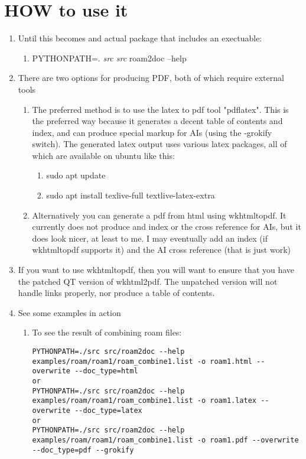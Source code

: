 \documentclass[11pt]{article}
\begin{document}
\section{HOW to use it  }
 \label{obj-47}
 \label{obj-46}
\begin{enumerate}
\item
Until this becomes and actual package that includes an exectuable:
\begin{enumerate}
\item
PYTHONPATH=.
\emph{src src}
roam2doc --help
\end{enumerate}
\item
There are two options for producing PDF, both of which require external tools
\begin{enumerate}
\item
The preferred method is to use the latex to pdf tool
      "pdflatex". This is the preferred way because it generates a decent
      table of contents and index, and can produce special markup for AIs
      (using the -grokify switch). The generated latex output uses various latex
      packages, all of which are available on ubuntu like this:

\begin{enumerate}
\item
sudo apt update
\item
sudo apt install texlive-full textlive-latex-extra
\end{enumerate}
\item
Alternatively you can generate a pdf from html using wkhtmltopdf. It
      currently does not produce and index or the cross reference for AIs,
      but it does look nicer, at least to me. I may eventually add an index
      (if wkhtmltopdf supports it) and the AI cross reference (that is just work)

\end{enumerate}
\item
If you want to use wkhtmltopdf, then you
   will want to ensure that you have the patched QT version of wkhtml2pdf. The
   unpatched version will not handle links properly, nor produce a table of contents.

\item
See some examples in action
\begin{enumerate}
\item
To see the result of combining roam files:
\begin{verbatim}
PYTHONPATH=./src src/roam2doc --help examples/roam/roam1/roam_combine1.list -o roam1.html --overwrite --doc_type=html
or
PYTHONPATH=./src src/roam2doc --help examples/roam/roam1/roam_combine1.list -o roam1.latex --overwrite --doc_type=latex
or 
PYTHONPATH=./src src/roam2doc --help examples/roam/roam1/roam_combine1.list -o roam1.pdf --overwrite --doc_type=pdf --grokify


\end{verbatim}
\end{enumerate}
\end{enumerate}
\end{document}
